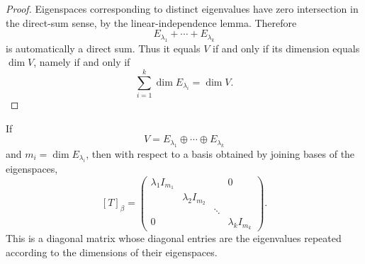 \documentclass[11pt,openany]{article}
\begin{document}
\begin{proof}
	Eigenspaces corresponding to distinct eigenvalues have zero intersection in the direct-sum sense, by the linear-independence lemma.  Therefore
	\[
	E_{\lambda_1}+\cdots+E_{\lambda_k}
	\]
	is automatically a direct sum.  Thus it equals $V$ if and only if its dimension equals $\dim V$, namely if and only if
	\[
	\sum_{i=1}^k\dim E_{\lambda_i}=\dim V.
	\]
\end{proof}

\begin{remark}
	If
	\[
	V=E_{\lambda_1}\oplus\cdots\oplus E_{\lambda_k}
	\]
	and $m_i=\dim E_{\lambda_i}$, then with respect to a basis obtained by joining bases of the eigenspaces,
	\[
	[T]_{\beta}
	=\begin{pmatrix}
		\lambda_1 I_{m_1}&&&0\\
		&\lambda_2 I_{m_2}&&\\
		&&\ddots&\\
		0&&&\lambda_k I_{m_k}
	\end{pmatrix}.
	\]
	This is a diagonal matrix whose diagonal entries are the eigenvalues repeated according to the dimensions of their eigenspaces.
\end{remark}

\newpage
\end{document}
